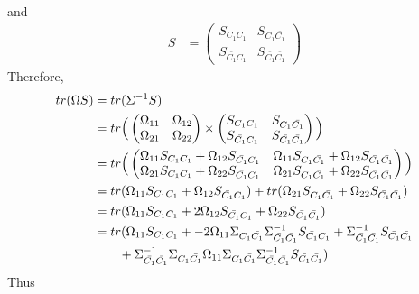 \documentclass[12pt, leqno]{article}
\def\s{\ensuremath\Sigma}
\def\om{\ensuremath\Omega}
\begin{document}
and 
\begin{align*}
S &= 
\begin{pmatrix} 
S_{C_1 C_1} & S_{C_1 \bar{C_1}} \\
S_{{\bar{C_1} {C_1}}} & S_{\bar{C_1} \bar{C_1}}  
\end{pmatrix}
\end{align*}
Therefore,
\begin{align*}
tr(\om S) &= tr (\s^{-1} S) \\
&= tr \Big( \begin{pmatrix} 
\om_{11} & \om_{12}\\
\om_{21} & \om_{22}
\end{pmatrix} \times \begin{pmatrix} 
S_{C_1 C_1} & S_{C_1 \bar{C_1}} \\
S_{{\bar{C_1} {C_1}}} & S_{\bar{C_1} \bar{C_1}}  
\end{pmatrix} \Big) \\
&= tr\Big( \begin{pmatrix} 
\om_{11}S_{C_1 C_1} + \om_{12} S_{{\bar{C_1} {C_1}}}  & \om_{11} S_{C_1 \bar{C_1}} + \om_{12} S_{{\bar{C_1} \bar{C_1}}} \\
\om_{21} S_{C_1 C_1}  + \om_{22} S_{{\bar{C_1} {C_1}}} & \om_{21} S_{C_1 \bar{C_1}} + \om_{22} S_{{\bar{C_1} \bar{C_1}}}
\end{pmatrix}\Big) \\
&= tr(\om_{11}S_{C_1 C_1} + \om_{12} S_{{\bar{C_1} {C_1}}}) +
  tr(\om_{21} S_{C_1 \bar{C_1}} + \om_{22} S_{{\bar{C_1} \bar{C_1}}})
  \\
&= tr(\om_{11}S_{C_1 C_1} + 2 \om_{12} S_{{\bar{C_1} {C_1}}} +
  \om_{22} S_{{\bar{C_1} \bar{C_1}}}) \\
&= tr(\om_{11}S_{C_1 C_1} + - 2\om_{11} \s_{C_1 \bar{C_1}} \s_{\bar{C_1}
  \bar{C_1}}^{-1} S_{{\bar{C_1} {C_1}}} +  \s_{\bar{C_1}
  \bar{C_1}}^{-1} S_{{\bar{C_1} \bar{C_1}}} \\ & \qquad + \s_{\bar{C_1}
  \bar{C_1}}^{-1} \s_{C_1 \bar{C_1}}  \om_{11} \s_{{C_1
           \bar{C_1}}} \s_{\bar{C_1}
  \bar{C_1}}^{-1}  S_{{\bar{C_1} \bar{C_1}}})
\end{align*}
Thus 
\end{document}
